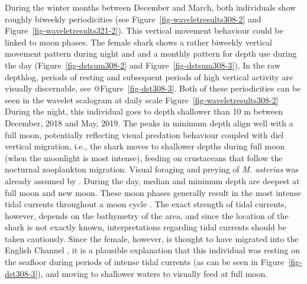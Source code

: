 \documentclass[
  authoryear,
  review,
  3p]{elsarticle}
\begin{document}
During the winter months between December and March, both individuals
show roughly biweekly periodicities (see
Figure~\ref{fig-waveletresults308-2} and
Figure~\ref{fig-waveletresults321-2}). This vertical movement behaviour
could be linked to moon phases. The female shark shows a rather biweekly
vertical movement pattern during night and and a monthly pattern for
depth use during the day (Figure~\ref{fig-dstsum308-2} and
Figure~\ref{fig-dstsum308-3}), In the raw depthlog, periods of resting
and subsequent periods of high vertical activity are visually
discernable, see @Figure~\ref{fig-dst308-3}. Both of these periodicities
can be seen in the wavelet scalogram at daily scale
Figure~\ref{fig-waveletresults308-2} During the night, this individual
goes to depth shallower than 10 m between December, 2018 and May, 2019.
The peaks in minimum depth align well with a full moon, potentially
reflecting visual predation behaviour coupled with diel vertical
migration, i.e., the shark moves to shallower depths during full moon
(when the moonlight is most intense), feeding on crustaceans that follow
the nocturnal zooplankton migration. Visual foraging and preying of
\emph{M. asterias} was already assumed by \citet{griffiths_2020}. During
the day, median and minimum depth are deepest at full moon and new moon.
These moon phases generally result in the most intense tidal currents
throughout a moon cycle \citep{arnold_1994}. The exact strength of tidal
currents, however, depends on the bathymetry of the area, and since the
location of the shark is not exactly known, interpretations regarding
tidal currents should be taken cautiously. Since the female, however, is
thought to have migrated into the English Channel \citep[an area with
exceptionally high tidal currents,][]{salomon_1993}, it is a plausible
explanation that this individual was resting on the seafloor during
periods of intense tidal currents (as can be seen in
Figure~\ref{fig-dst308-3}), and moving to shallower waters to visually
feed at full moon.
\end{document}
